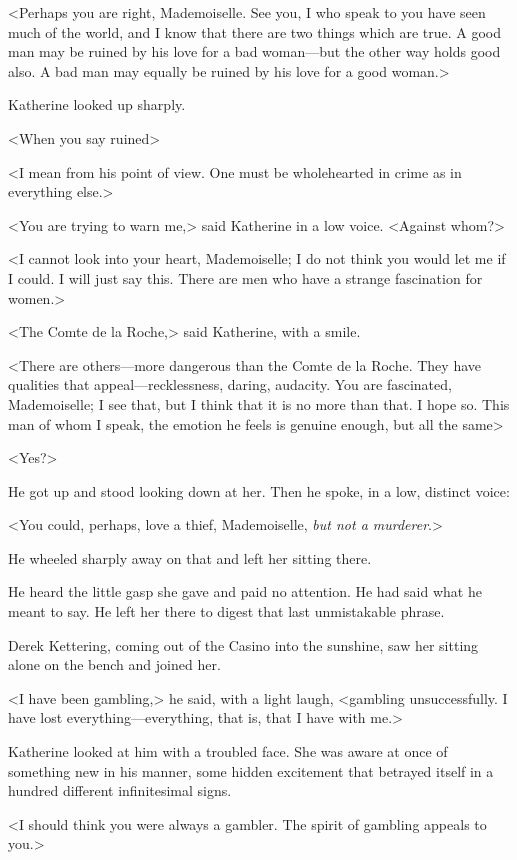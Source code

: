 <Perhaps you are right, Mademoiselle. See you, I who speak to you have seen much of the world, and I know that there are two things which are true. A good man may be ruined by his love for a bad woman—but the other way holds good also. A bad man may equally be ruined by his love for a good woman.>

Katherine looked up sharply.

<When you say ruined\longdash>

<I mean from his point of view. One must be wholehearted in crime as in everything else.>

<You are trying to warn me,> said Katherine in a low voice. <Against whom?>

<I cannot look into your heart, Mademoiselle; I do not think you would let me if I could. I will just say this. There are men who have a strange fascination for women.>

<The Comte de la Roche,> said Katherine, with a smile.

<There are others—more dangerous than the Comte de la Roche. They have qualities that appeal—recklessness, daring, audacity. You are fascinated, Mademoiselle; I see that, but I think that it is no more than that. I hope so. This man of whom I speak, the emotion he feels is genuine enough, but all the same\longdash>

<Yes?>

He got up and stood looking down at her. Then he spoke, in a low, distinct voice:

<You could, perhaps, love a thief, Mademoiselle, \emph{but not a murderer}.>

He wheeled sharply away on that and left her sitting there.

He heard the little gasp she gave and paid no attention. He had said what he meant to say. He left her there to digest that last unmistakable phrase.

Derek Kettering, coming out of the Casino into the sunshine, saw her sitting alone on the bench and joined her.

<I have been gambling,> he said, with a light laugh, <gambling unsuccessfully. I have lost everything—everything, that is, that I have with me.>

Katherine looked at him with a troubled face. She was aware at once of something new in his manner, some hidden excitement that betrayed itself in a hundred different infinitesimal signs.

<I should think you were always a gambler. The spirit of gambling appeals to you.>

